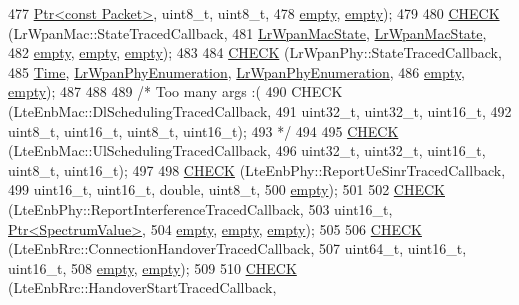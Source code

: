\begin{DoxyCode}
477          \hyperlink{classns3_1_1Ptr}{Ptr<const Packet>}, uint8\_t, uint8\_t,
478          \hyperlink{classns3_1_1empty}{empty}, \hyperlink{classns3_1_1empty}{empty});
479 
480   \hyperlink{traced-callback-typedef-test-suite_8cc_aa79806eee113005f96d9d3cb1480ce98}{CHECK} (LrWpanMac::StateTracedCallback,
481          \hyperlink{group__lr-wpan_ga02ee7efd682937a8781f5e6101f61884}{LrWpanMacState}, \hyperlink{group__lr-wpan_ga02ee7efd682937a8781f5e6101f61884}{LrWpanMacState},
482          \hyperlink{classns3_1_1empty}{empty}, \hyperlink{classns3_1_1empty}{empty}, \hyperlink{classns3_1_1empty}{empty});
483 
484   \hyperlink{traced-callback-typedef-test-suite_8cc_aa79806eee113005f96d9d3cb1480ce98}{CHECK} (LrWpanPhy::StateTracedCallback,
485          \hyperlink{classns3_1_1Time}{Time}, \hyperlink{group__lr-wpan_ga6494269d13d45c511a07b7ccbb1de754}{LrWpanPhyEnumeration}, 
      \hyperlink{group__lr-wpan_ga6494269d13d45c511a07b7ccbb1de754}{LrWpanPhyEnumeration},
486          \hyperlink{classns3_1_1empty}{empty}, \hyperlink{classns3_1_1empty}{empty});
487 
488 
489   \textcolor{comment}{/*  Too many args :(}
490 \textcolor{comment}{  CHECK (LteEnbMac::DlSchedulingTracedCallback,}
491 \textcolor{comment}{         uint32\_t, uint32\_t, uint16\_t,}
492 \textcolor{comment}{         uint8\_t, uint16\_t, uint8\_t, uint16\_t);}
493 \textcolor{comment}{  */}
494 
495   \hyperlink{traced-callback-typedef-test-suite_8cc_aa79806eee113005f96d9d3cb1480ce98}{CHECK} (LteEnbMac::UlSchedulingTracedCallback,
496          uint32\_t, uint32\_t, uint16\_t, uint8\_t, uint16\_t);
497 
498   \hyperlink{traced-callback-typedef-test-suite_8cc_aa79806eee113005f96d9d3cb1480ce98}{CHECK} (LteEnbPhy::ReportUeSinrTracedCallback,
499          uint16\_t, uint16\_t, \textcolor{keywordtype}{double}, uint8\_t,
500          \hyperlink{classns3_1_1empty}{empty});
501 
502   \hyperlink{traced-callback-typedef-test-suite_8cc_aa79806eee113005f96d9d3cb1480ce98}{CHECK} (LteEnbPhy::ReportInterferenceTracedCallback,
503          uint16\_t, \hyperlink{classns3_1_1Ptr}{Ptr<SpectrumValue>},
504          \hyperlink{classns3_1_1empty}{empty}, \hyperlink{classns3_1_1empty}{empty}, \hyperlink{classns3_1_1empty}{empty});
505 
506   \hyperlink{traced-callback-typedef-test-suite_8cc_aa79806eee113005f96d9d3cb1480ce98}{CHECK} (LteEnbRrc::ConnectionHandoverTracedCallback,
507          uint64\_t, uint16\_t, uint16\_t,
508          \hyperlink{classns3_1_1empty}{empty}, \hyperlink{classns3_1_1empty}{empty});
509 
510   \hyperlink{traced-callback-typedef-test-suite_8cc_aa79806eee113005f96d9d3cb1480ce98}{CHECK} (LteEnbRrc::HandoverStartTracedCallback,

\end{DoxyCode}
